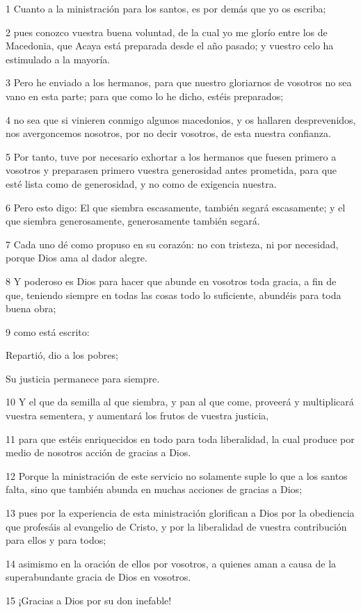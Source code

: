 \par 1 Cuanto a la ministración para los santos, es por demás que yo os escriba;
\par 2 pues conozco vuestra buena voluntad, de la cual yo me glorío entre los de Macedonia, que Acaya está preparada desde el año pasado; y vuestro celo ha estimulado a la mayoría.
\par 3 Pero he enviado a los hermanos, para que nuestro gloriarnos de vosotros no sea vano en esta parte; para que como lo he dicho, estéis preparados;
\par 4 no sea que si vinieren conmigo algunos macedonios, y os hallaren desprevenidos, nos avergoncemos nosotros, por no decir vosotros, de esta nuestra confianza.
\par 5 Por tanto, tuve por necesario exhortar a los hermanos que fuesen primero a vosotros y preparasen primero vuestra generosidad antes prometida, para que esté lista como de generosidad, y no como de exigencia nuestra.
\par 6 Pero esto digo: El que siembra escasamente, también segará escasamente; y el que siembra generosamente, generosamente también segará.
\par 7 Cada uno dé como propuso en su corazón: no con tristeza, ni por necesidad, porque Dios ama al dador alegre.
\par 8 Y poderoso es Dios para hacer que abunde en vosotros toda gracia, a fin de que, teniendo siempre en todas las cosas todo lo suficiente, abundéis para toda buena obra;
\par 9 como está escrito:
\par Repartió, dio a los pobres;
\par Su justicia permanece para siempre.
\par 10 Y el que da semilla al que siembra, y pan al que come, proveerá y multiplicará vuestra sementera, y aumentará los frutos de vuestra justicia,
\par 11 para que estéis enriquecidos en todo para toda liberalidad, la cual produce por medio de nosotros acción de gracias a Dios.
\par 12 Porque la ministración de este servicio no solamente suple lo que a los santos falta, sino que también abunda en muchas acciones de gracias a Dios;
\par 13 pues por la experiencia de esta ministración glorifican a Dios por la obediencia que profesáis al evangelio de Cristo, y por la liberalidad de vuestra contribución para ellos y para todos;
\par 14 asimismo en la oración de ellos por vosotros, a quienes aman a causa de la superabundante gracia de Dios en vosotros.
\par 15 ¡Gracias a Dios por su don inefable!

